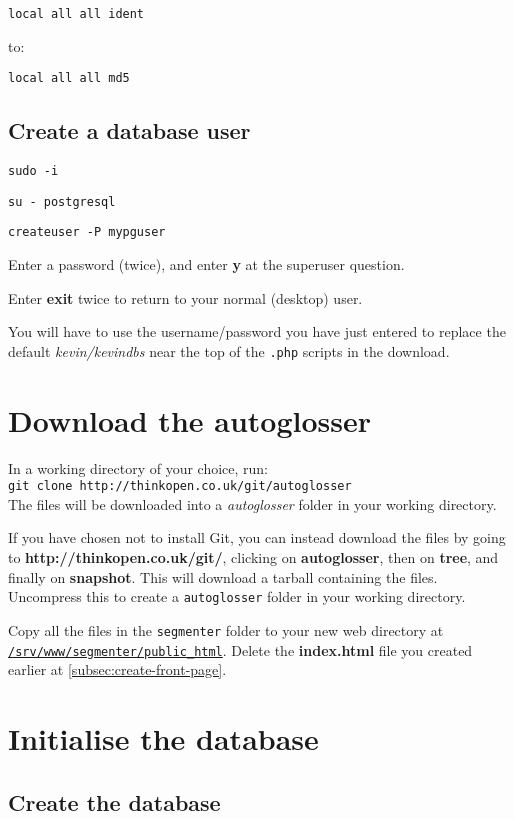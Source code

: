 \documentclass[a4paper,10pt]{article}
\begin{document}
\texttt{local   all	all	ident}

to:

\texttt{local   all	all	md5}

\subsection{Create a database user}
\label{subsec:create-db-user}

\texttt{sudo -i}

\texttt{su - postgresql}

\texttt{createuser -P mypguser}

Enter a password (twice), and enter \textbf{y} at the superuser question.

Enter \textbf{exit} twice to return to your normal (desktop) user.

You will have to use the username/password you have just entered to replace the default \textit{kevin/kevindbs} near the top of the \texttt{.php} scripts in the download.

\section{Download the autoglosser}

In a working directory of your choice, run:\\
\texttt{git clone http://thinkopen.co.uk/git/autoglosser}\\
The files will be downloaded into a \textit{autoglosser} folder in your working directory.

If you have chosen not to install Git, you can instead download the files by going to \textbf{http://thinkopen.co.uk/git/}, clicking on \textbf{autoglosser}, then on \textbf{tree}, and finally on \textbf{snapshot}.  This will download a tarball containing the files.  Uncompress this to create a \texttt{autoglosser} folder in your working directory.

Copy all the files in the \texttt{segmenter} folder to your new web directory at \texttt{\url{/srv/www/segmenter/public_html}}.  Delete the \textbf{index.html} file you created earlier at \ref{subsec:create-front-page}.

\section{Initialise the database}

\subsection{Create the database}
\end{document}
